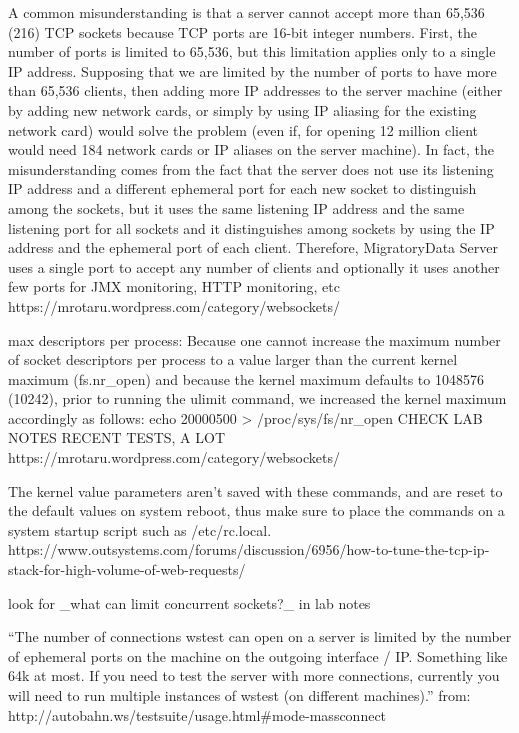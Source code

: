 \documentclass{uvamscse}
\begin{document}
A common misunderstanding is that a server cannot accept more than 65,536 (216) TCP sockets because TCP ports are 16-bit integer numbers.
First, the number of ports is limited to 65,536, but this limitation applies only to a single IP address. Supposing that we are limited by the number of ports to have more than 65,536 clients, then adding more IP addresses to the server machine (either by adding new network cards, or simply by using IP aliasing for the existing network card) would solve the problem (even if, for opening 12 million client would need 184 network cards or IP aliases on the server machine).
In fact, the misunderstanding comes from the fact that the server does not use its listening IP address and a different ephemeral port for each new socket to distinguish among the sockets, but it uses the same listening IP address and the same listening port for all sockets and it distinguishes among sockets by using the IP address and the ephemeral port of each client. Therefore, MigratoryData Server uses a single port to accept any number of clients and optionally it uses another few ports for JMX monitoring, HTTP monitoring, etc
https://mrotaru.wordpress.com/category/websockets/

max descriptors per process:
Because one cannot increase the maximum number of socket descriptors per process to a value larger than the current kernel maximum (fs.nr\_open) and because the kernel maximum defaults to 1048576 (10242), prior to running the ulimit command, we increased the kernel maximum accordingly as follows:
echo 20000500 > /proc/sys/fs/nr\_open
CHECK LAB NOTES RECENT TESTS, A LOT
https://mrotaru.wordpress.com/category/websockets/

The kernel value parameters aren't saved with these commands, and are reset to the default values on system reboot, thus make sure to place the commands on a system startup script such as /etc/rc.local.
https://www.outsystems.com/forums/discussion/6956/how-to-tune-the-tcp-ip-stack-for-high-volume-of-web-requests/

look for \_what can limit concurrent sockets?\_ in lab notes

“The number of connections wstest can open on a server is limited by the number of ephemeral ports on the machine on the outgoing interface / IP. Something like 64k at most. If you need to test the server with more connections, currently you will need to run multiple instances of wstest (on different machines).” from: http://autobahn.ws/testsuite/usage.html\#mode-massconnect
\end{document}
